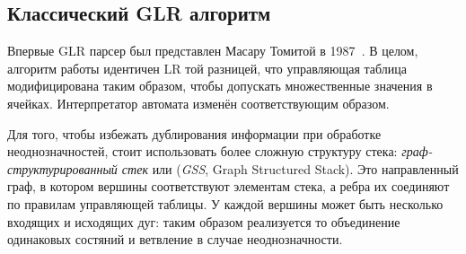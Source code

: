 \subsection{Классический GLR алгоритм}

Впервые GLR парсер был представлен Масару Томитой в 1987~\cite{tomita-1987-efficient}. В целом, алгоритм работы идентичен LR той разницей, что управляющая таблица модифицирована таким образом, чтобы допускать множественные значения в ячейках. Интерпретатор автомата изменён соответствующим образом.

Для того, чтобы избежать дублирования информации при обработке неоднозначностей, стоит использовать более сложную структуру стека: \textit{граф-структурированный стек} или (\textit{GSS}, Graph Structured Stack). Это направленный граф, в котором вершины соответствуют элементам стека, а ребра их соединяют по правилам управляющей таблицы. У каждой вершины может быть несколько входящих и исходящих дуг: таким образом реализуется то объединение одинаковых состяний и ветвление в случае неоднозначности.

